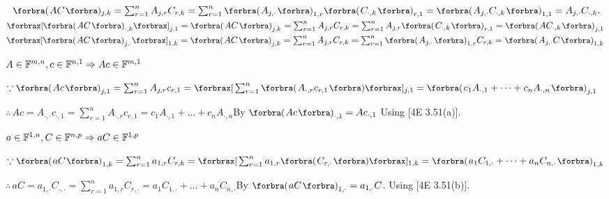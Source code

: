 \BulletPointX\NoteForSmall{[3.47]}\,\, $\BigPar{AC}{_{j,k}}=\sum_{r=1}^n A_{j,r}C_{r,k}=\sum_{r=1}^n \BigPar{A_{j,\cdot}}_{1,r}\BigPar{C_{\cdot,k}}_{r,1}=\BigPar{A_{j,\cdot}C_{\cdot,k}}_{1,1}=A_{j,\cdot}C_{\cdot,k}.$\PfEnd\vspace{6pt}
\BulletPointX\NoteForSmall{[3.49]} $\XSbra{\BigPar{AC}_{\cdot,k}}_{j,1}=\BigPar{AC}_{j,k}=\sum_{r=1}^n A_{j,r}C_{r,k}=\sum_{r=1}^n A_{j,r}\BigPar{C_{\cdot,k}}_{r,1}=\BigPar{AC_{\cdot,k}}_{j,1}$\PfEnd\vspace{6pt}
\BulletPointX{} $\XSbra{\BigPar{AC}_{j,\cdot}}_{1,k}=\BigPar{AC}_{j,k}=\sum_{r=1}^n A_{j,r}C_{r,k}=\sum_{r=1}^n \BigPar{A_{j,\cdot}}_{1,r}C_{r,k}=\BigPar{A_{j,\cdot}C}_{1,k}$\PfEnd
\SepLine

\BulletPointX{}\quad $A\in{\mathbb{F}}^{m,n},c\in{\mathbb{F}}^{n,1}\Rightarrow Ac\in{\mathbb{F}}^{m,1}$\vspace{2pt}\par\quad
$\because\BigPar{Ac}_{j,1}=\sum_{r=1}^n A_{j,r}c_{r,1}=\XSbra{\sum_{r=1}^n\BigPar{A_{\cdot,r}c_{r,1}}}{_{j,1}}=\BigPar{c_1 A_{\cdot,1}+\dots+c_n A_{\cdot,n}}_{j,1}$\vspace{3pt}\par\quad
$\therefore\,Ac=A_{\cdot,\cdot}c_{\cdot,1}=\sum_{r=1}^n A_{\cdot,r}c_{r,1}=c_1 A_{\cdot,1}+\dots+c_n A_{\cdot,n}$\quad \Or By $\BigPar{Ac}_{\cdot,1}=Ac_{\cdot,1}$ Using [4E 3.51(a)].\PfEnd
\SepLine

\BulletPointX{}\quad$a\in{\mathbb{F}}^{1,n},C\in{\mathbb{F}}^{n,p}\Rightarrow aC\in{\mathbb{F}}^{1,p}$\vspace{2pt}\par\quad
$\because\BigPar{aC}_{1,k}=\sum_{r=1}^n a_{1,r}C_{r,k}=\XSbra{\sum_{r=1}^n a_{1,r}\BigPar{C_{r,\cdot}}}{_{1,k}}=\BigPar{a_1 C_{1,\cdot}+\dots+a_n C_{n,\cdot}}_{1,k}$\vspace{3pt}\par\quad
$\therefore\,aC=a_{1,\cdot}C_{\cdot,\cdot}=\sum_{r=1}^n a_{1,r}C_{r,\cdot}=a_1 C_{1,\cdot}+\dots+a_n C_{n,\cdot}$\quad \Or By $\BigPar{aC}_{1,\cdot}=a_{1,\cdot}C$. Using [4E 3.51(b)].\PfEnd
\SepLine

